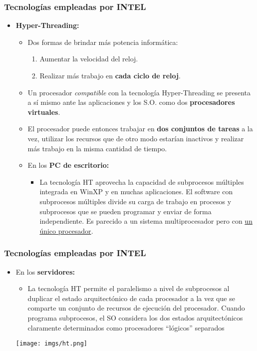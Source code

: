 \frame
{
\frametitle{Tecnologías empleadas por INTEL}
\begin{itemize}
 \item \textbf{Hyper-Threading:}
 \begin{itemize}
  \item Dos formas de brindar más potencia informática:
	\begin{enumerate}
	 \item Aumentar la velocidad del reloj.
	 \item Realizar más trabajo en \textbf{cada ciclo de reloj}.
	\end{enumerate}
  \item Un procesador \textit{compatible} con la tecnología Hyper-Threading se presenta a sí mismo ante las aplicaciones y los S.O. como dos \textbf{procesadores virtuales}.
  \item El procesador puede entonces trabajar en \textbf{dos conjuntos de tareas} a la vez, utilizar los recursos que de otro modo estarían inactivos y realizar más trabajo en la misma cantidad de tiempo.
  \item En los \textbf{PC de escritorio:}
	\begin{itemize}
	 \item La tecnología HT aprovecha la capacidad de subprocesos múltiples integrada en WinXP y en muchas aplicaciones. El software con subprocesos múltiples divide su carga de trabajo en procesos y subprocesos que se pueden programar y enviar de forma independiente. Es parecido a un sistema multiprocesador pero con \underline{un único procesador}.
	\end{itemize}
 \end{itemize}
\end{itemize}
}

\frame
{
\frametitle{Tecnologías empleadas por INTEL}
\begin{itemize}
  \item En los \textbf{servidores:}
	\begin{itemize}
	 \item La tecnología HT permite el paralelismo a nivel de subprocesos al duplicar el estado arquitectónico de cada procesador a la vez que se comparte un conjunto de recursos de ejecución del procesador. Cuando programa subprocesos, el SO considera los dos estados arquitectónicos claramente determinados como procesadores ``lógicos'' separados
	\end{itemize}
 
\begin{center}
  \texttt{[image: imgs/ht.png]}
\end{center}
\end{itemize}
}

